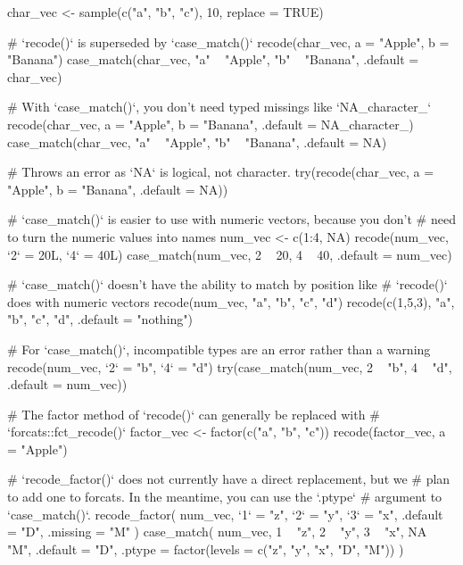 \documentclass[a4paper]{book}
\begin{document}
%
\begin{Examples}
\begin{ExampleCode}
char_vec <- sample(c("a", "b", "c"), 10, replace = TRUE)

# `recode()` is superseded by `case_match()`
recode(char_vec, a = "Apple", b = "Banana")
case_match(char_vec, "a" ~ "Apple", "b" ~ "Banana", .default = char_vec)

# With `case_match()`, you don't need typed missings like `NA_character_`
recode(char_vec, a = "Apple", b = "Banana", .default = NA_character_)
case_match(char_vec, "a" ~ "Apple", "b" ~ "Banana", .default = NA)

# Throws an error as `NA` is logical, not character.
try(recode(char_vec, a = "Apple", b = "Banana", .default = NA))

# `case_match()` is easier to use with numeric vectors, because you don't
# need to turn the numeric values into names
num_vec <- c(1:4, NA)
recode(num_vec, `2` = 20L, `4` = 40L)
case_match(num_vec, 2 ~ 20, 4 ~ 40, .default = num_vec)

# `case_match()` doesn't have the ability to match by position like
# `recode()` does with numeric vectors
recode(num_vec, "a", "b", "c", "d")
recode(c(1,5,3), "a", "b", "c", "d", .default = "nothing")

# For `case_match()`, incompatible types are an error rather than a warning
recode(num_vec, `2` = "b", `4` = "d")
try(case_match(num_vec, 2 ~ "b", 4 ~ "d", .default = num_vec))

# The factor method of `recode()` can generally be replaced with
# `forcats::fct_recode()`
factor_vec <- factor(c("a", "b", "c"))
recode(factor_vec, a = "Apple")

# `recode_factor()` does not currently have a direct replacement, but we
# plan to add one to forcats. In the meantime, you can use the `.ptype`
# argument to `case_match()`.
recode_factor(
  num_vec,
  `1` = "z",
  `2` = "y",
  `3` = "x",
  .default = "D",
  .missing = "M"
)
case_match(
  num_vec,
  1 ~ "z",
  2 ~ "y",
  3 ~ "x",
  NA ~ "M",
  .default = "D",
  .ptype = factor(levels = c("z", "y", "x", "D", "M"))
)
\end{ExampleCode}
\end{Examples}
\end{document}
